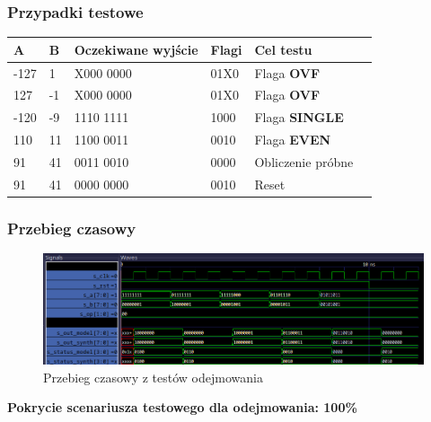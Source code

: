 \documentclass[12pt]{article}
\begin{document}
	\subsubsection*{Przypadki testowe}
	
		\begin{table}[!ht]
			\centering
				\begin{adjustbox}{center}
			\begin{tabular}{|l|l|l|l|l|l|}
				\hline
				\textbf{A} & \textbf{B} & \textbf{Oczekiwane wyjście} & \textbf{Flagi} & \textbf{Cel testu} \\ \hline
				-127 & 1 &  X000 0000 & 01X0 & Flaga \textbf{OVF} \\ \hline
				127 & -1 &  X000 0000 & 01X0 & Flaga \textbf{OVF} \\ \hline
				-120 & -9 &  1110 1111 & 1000 & Flaga \newline \textbf{SINGLE} \\ \hline
				110 & 11 & 1100 0011 & 0010 & Flaga \textbf{EVEN} \\ \hline
				91 & 41 &  0011 0010 & 0000& Obliczenie próbne \\ \hline
				91 & 41 &  0000 0000 & 0010 & Reset \\ \hline
			\end{tabular}
			\end{adjustbox}
		\end{table}
\vspace{-20pt}
	\subsubsection*{Przebieg czasowy}
		\begin{figure}[!h]
		\begin{center}
			\includegraphics[width=\textwidth]{../Testy/Wyniki_testow/Testy_sub.png}
			\caption*{Przebieg czasowy z testów odejmowania}
			\label{figure:test_sub}
		\end{center}
	\end{figure}
	\vspace{-20pt}
	\textbf{Pokrycie scenariusza testowego dla odejmowania: 100\%}
	
\end{document}
